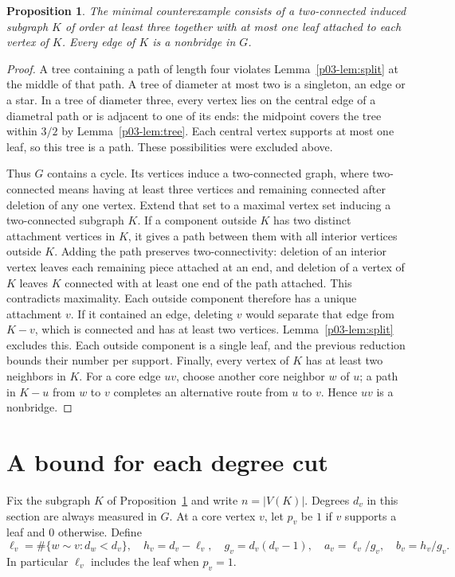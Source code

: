 \documentclass[11pt,a4paper]{article}
\newtheorem{proposition}[theorem]{Proposition}
\begin{document}
\begin{proposition}\label{p03-prop:core}
The minimal counterexample consists of a two-connected induced subgraph
$K$ of order at least three together with at most one leaf attached to
each vertex of $K$. Every edge of $K$ is a nonbridge in $G$.
\end{proposition}
\begin{proof}
A tree containing a path of length four violates Lemma~\ref{p03-lem:split}
at the middle of that path. A tree of diameter at most two is a
singleton, an edge or a star. In a tree of diameter three, every vertex
lies on the central edge of a diametral path or is adjacent to one of
its ends: the midpoint covers the tree within $3/2$ by
Lemma~\ref{p03-lem:tree}. Each central vertex supports at most one leaf,
so this tree is a path. These possibilities were excluded above.

Thus $G$ contains a cycle. Its vertices induce a two-connected graph,
where two-connected means having at least three vertices and remaining
connected after deletion of any one vertex. Extend that set to a
maximal vertex set inducing a two-connected subgraph $K$. If a component
outside $K$ has two distinct attachment vertices in $K$, it gives a
path between them with all interior vertices outside $K$. Adding the
path preserves two-connectivity: deletion of an interior vertex leaves
each remaining piece attached at an end, and deletion of a vertex of
$K$ leaves $K$ connected with at least one end of the path attached.
This contradicts maximality. Each outside component therefore has a
unique attachment $v$. If it contained an edge, deleting $v$ would
separate that edge from $K-v$, which is connected and has at least
two vertices. Lemma~\ref{p03-lem:split} excludes this. Each outside
component is a single leaf, and the previous reduction bounds their
number per support. Finally, every vertex of $K$ has at least two
neighbors in $K$. For a core edge $uv$, choose another core neighbor
$w$ of $u$; a path in $K-u$ from $w$ to $v$ completes an alternative
route from $u$ to $v$. Hence $uv$ is a nonbridge.
\end{proof}

\section{A bound for each degree cut}\label{p03-sec:cuts}
Fix the subgraph $K$ of Proposition~\ref{p03-prop:core} and write
$n=|V(K)|$. Degrees $d_v$ in this section are always measured in $G$.
At a core vertex $v$, let $p_v$ be $1$ if $v$ supports a leaf and
$0$ otherwise. Define
\[
 \ell_v=\#\{w\sim v:d_w<d_v\},\quad h_v=d_v-\ell_v,\quad
 g_v=d_v(d_v-1),\quad a_v=\ell_v/g_v,\quad b_v=h_v/g_v .
\]
In particular $\ell_v$ includes the leaf when $p_v=1$.
\end{document}

